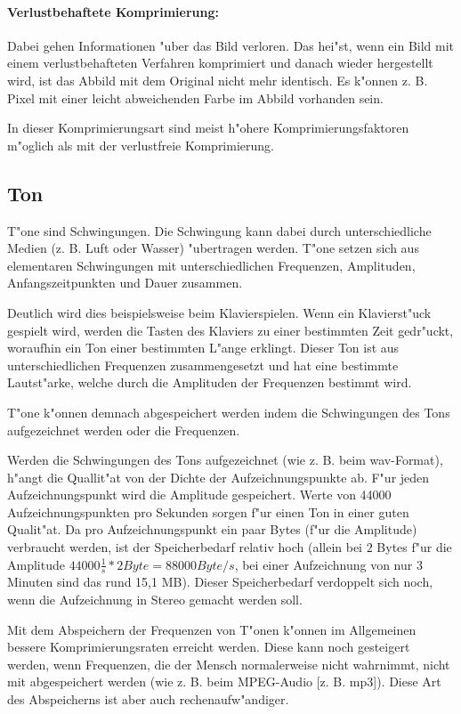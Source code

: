 \paragraph{Verlustbehaftete Komprimierung:}

Dabei gehen Informationen "uber das Bild verloren. Das hei"st, wenn ein Bild mit einem verlustbehafteten Verfahren komprimiert und danach wieder hergestellt wird, ist das Abbild mit dem Original nicht mehr identisch. Es k"onnen z. B. Pixel mit einer leicht abweichenden Farbe im Abbild vorhanden sein.

In dieser Komprimierungsart sind meist h"ohere Komprimierungsfaktoren m"oglich als mit der verlustfreie Komprimierung.


\subsection{Ton}

T"one sind Schwingungen. Die Schwingung kann dabei durch unterschiedliche Medien (z. B. Luft oder Wasser) "ubertragen werden. T"one setzen sich aus elementaren Schwingungen mit unterschiedlichen Frequenzen, Amplituden, Anfangszeitpunkten und Dauer zusammen.

Deutlich wird dies beispielsweise beim Klavierspielen. Wenn ein Klavierst"uck gespielt wird, werden die Tasten des Klaviers zu einer bestimmten Zeit gedr"uckt, woraufhin ein Ton einer bestimmten L"ange erklingt. Dieser Ton ist aus unterschiedlichen Frequenzen zusammengesetzt und hat eine bestimmte Lautst"arke, welche durch die Amplituden der Frequenzen bestimmt wird.

\bigskip\noindent
T"one k"onnen demnach abgespeichert werden indem die Schwingungen des Tons aufgezeichnet werden oder die Frequenzen.

Werden die Schwingungen des Tons aufgezeichnet (wie z. B. beim wav-Format), h"angt die Quallit"at von der Dichte der Aufzeichnungspunkte ab. F"ur jeden Aufzeichnungspunkt wird die Amplitude gespeichert. Werte von 44000 Aufzeichnungspunkten pro Sekunden sorgen f"ur einen Ton in einer guten Qualit"at. Da pro Aufzeichnungspunkt ein paar Bytes (f"ur die Amplitude) verbraucht werden, ist der Speicherbedarf relativ hoch (allein bei $2$ Bytes f"ur die Amplitude $44000 \frac{1}{s} * 2 Byte = 88000 Byte/s$, bei einer Aufzeichnung von nur 3 Minuten sind das rund 15,1 MB). Dieser Speicherbedarf verdoppelt sich noch, wenn die Aufzeichnung in Stereo gemacht werden soll.

Mit dem Abspeichern der Frequenzen von T"onen k"onnen im Allgemeinen bessere Komprimierungsraten erreicht werden. Diese kann noch gesteigert werden, wenn Frequenzen, die der Mensch normalerweise nicht wahrnimmt, nicht mit abgespeichert werden (wie z. B. beim MPEG-Audio [z. B. mp3]). Diese Art des Abspeicherns ist aber auch rechenaufw"andiger.






